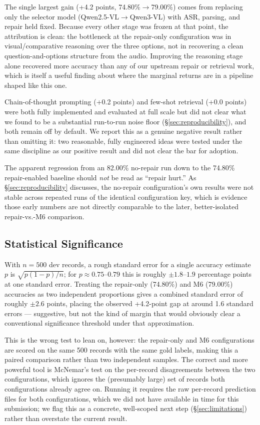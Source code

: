 \documentclass[11pt]{article}
\begin{document}
The single largest gain (+4.2 points, 74.80\%$\rightarrow$79.00\%) comes from replacing only the selector model (Qwen2.5-VL$\rightarrow$Qwen3-VL) with ASR, parsing, and repair held fixed. Because every other stage was frozen at that point, the attribution is clean: the bottleneck at the repair-only configuration was in visual/comparative reasoning over the three options, not in recovering a clean question-and-options structure from the audio. Improving the reasoning stage alone recovered more accuracy than any of our upstream repair or retrieval work, which is itself a useful finding about where the marginal returns are in a pipeline shaped like this one.

Chain-of-thought prompting (+0.2 points) and few-shot retrieval (+0.0 points) were both fully implemented and evaluated at full scale but did not clear what we found to be a substantial run-to-run noise floor (\S\ref{sec:reproducibility}), and both remain off by default. We report this as a genuine negative result rather than omitting it: two reasonable, fully engineered ideas were tested under the same discipline as our positive result and did not clear the bar for adoption.

The apparent regression from an 82.00\% no-repair run down to the 74.80\% repair-enabled baseline should \emph{not} be read as ``repair hurt.'' As \S\ref{sec:reproducibility} discusses, the no-repair configuration's own results were not stable across repeated runs of the identical configuration key, which is evidence those early numbers are not directly comparable to the later, better-isolated repair-vs.-M6 comparison.

\subsection{Statistical Significance}
\label{sec:significance}

With $n=500$ dev records, a rough standard error for a single accuracy estimate $p$ is $\sqrt{p(1-p)/n}$; for $p \approx 0.75$--$0.79$ this is roughly $\pm 1.8$--$1.9$ percentage points at one standard error. Treating the repair-only (74.80\%) and M6 (79.00\%) accuracies as two independent proportions gives a combined standard error of roughly $\pm 2.6$ points, placing the observed +4.2-point gap at around 1.6 standard errors --- suggestive, but not the kind of margin that would obviously clear a conventional significance threshold under that approximation.

This is the wrong test to lean on, however: the repair-only and M6 configurations are scored on the same 500 records with the same gold labels, making this a paired comparison rather than two independent samples. The correct and more powerful tool is McNemar's test on the per-record disagreements between the two configurations, which ignores the (presumably large) set of records both configurations already agree on. Running it requires the raw per-record prediction files for both configurations, which we did not have available in time for this submission; we flag this as a concrete, well-scoped next step (\S\ref{sec:limitations}) rather than overstate the current result.
\end{document}
